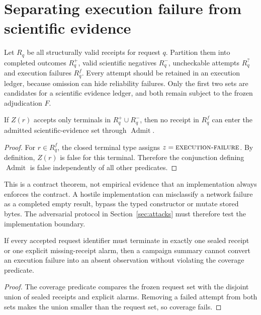 \section{Separating execution failure from scientific evidence}

Let $R_q$ be all structurally valid receipts for request $q$. Partition them into
completed outcomes $R_q^+$, valid scientific negatives $R_q^-$, uncheckable
attempts $R_q^?$ and execution failures $R_q^f$. Every attempt should be retained
in an execution ledger, because omission can hide reliability failures. Only the
first two sets are candidates for a scientific evidence ledger, and both remain
subject to the frozen adjudication $F$.

\begin{proposition}
If $Z(r)$ accepts only terminals in $R_q^+\cup R_q^-$, then no receipt in
$R_q^f$ can enter the admitted scientific-evidence set through
$\operatorname{Admit}$.
\end{proposition}

\begin{proof}
For $r\in R_q^f$, the closed terminal type assigns $z=\textsc{execution-failure}$. By definition,
$Z(r)$ is false for this terminal. Therefore the conjunction defining
$\operatorname{Admit}$ is false independently of all other predicates.
\end{proof}

This is a contract theorem, not empirical evidence that an implementation always
enforces the contract. A hostile implementation can misclassify a network failure
as a completed empty result, bypass the typed constructor or mutate stored bytes.
The adversarial protocol in Section~\ref{sec:attacks} must therefore test the
implementation boundary.

\begin{proposition}
If every accepted request identifier must terminate in exactly one sealed receipt
or one explicit missing-receipt alarm, then a campaign summary cannot convert an
execution failure into an absent observation without violating the coverage
predicate.
\end{proposition}

\begin{proof}
The coverage predicate compares the frozen request set with the disjoint union of
sealed receipts and explicit alarms. Removing a failed attempt from both sets makes
the union smaller than the request set, so coverage fails.
\end{proof}

